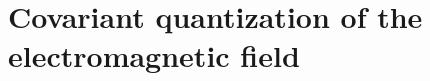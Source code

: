 \documentclass[main.tex]{subfiles}
\begin{document}
\section{Covariant quantization of the electromagnetic field}

\end{document}
